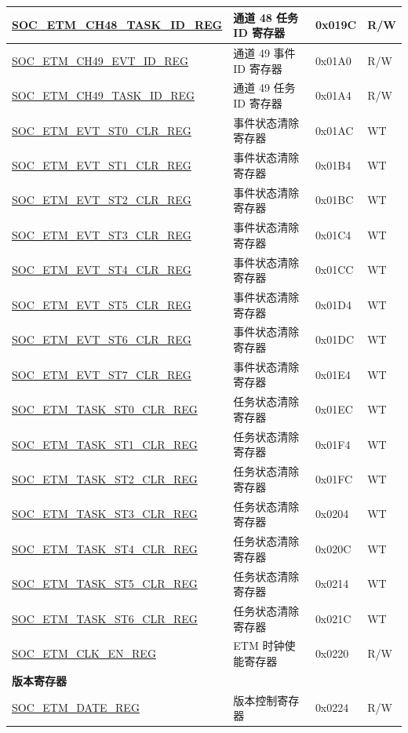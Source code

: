 \begin{longtable}{ | p{6cm} | p{6.4cm} | p{1.3cm} | p{1.8cm} | }
\hyperref[regdesc:SOCETMCH0TASKIDREG]{SOC\_ETM\_CH48\_TASK\_ID\_REG} & 通道 48 任务 ID 寄存器 & 0x019C & R/W \\ \hline
\hyperref[regdesc:SOCETMCH0EVTIDREG]{SOC\_ETM\_CH49\_EVT\_ID\_REG} & 通道 49 事件 ID 寄存器 & 0x01A0 & R/W \\ \hline
\hyperref[regdesc:SOCETMCH0TASKIDREG]{SOC\_ETM\_CH49\_TASK\_ID\_REG} & 通道 49 任务 ID 寄存器 & 0x01A4 & R/W \\ \hline
\hyperref[regdesc:SOCETMEVTST0CLRREG]{SOC\_ETM\_EVT\_ST0\_CLR\_REG} & 事件状态清除寄存器 & 0x01AC & WT \\ \hline
\hyperref[regdesc:SOCETMEVTST1CLRREG]{SOC\_ETM\_EVT\_ST1\_CLR\_REG} & 事件状态清除寄存器 & 0x01B4 & WT \\ \hline
\hyperref[regdesc:SOCETMEVTST2CLRREG]{SOC\_ETM\_EVT\_ST2\_CLR\_REG} & 事件状态清除寄存器 & 0x01BC & WT \\ \hline
\hyperref[regdesc:SOCETMEVTST3CLRREG]{SOC\_ETM\_EVT\_ST3\_CLR\_REG} & 事件状态清除寄存器 & 0x01C4 & WT \\ \hline
\hyperref[regdesc:SOCETMEVTST4CLRREG]{SOC\_ETM\_EVT\_ST4\_CLR\_REG} & 事件状态清除寄存器 & 0x01CC & WT \\ \hline
\hyperref[regdesc:SOCETMEVTST5CLRREG]{SOC\_ETM\_EVT\_ST5\_CLR\_REG} & 事件状态清除寄存器 & 0x01D4 & WT \\ \hline
\hyperref[regdesc:SOCETMEVTST6CLRREG]{SOC\_ETM\_EVT\_ST6\_CLR\_REG} & 事件状态清除寄存器 & 0x01DC & WT \\ \hline
\hyperref[regdesc:SOCETMEVTST7CLRREG]{SOC\_ETM\_EVT\_ST7\_CLR\_REG} & 事件状态清除寄存器 & 0x01E4 & WT \\ \hline
\hyperref[regdesc:SOCETMTASKST0CLRREG]{SOC\_ETM\_TASK\_ST0\_CLR\_REG} & 任务状态清除寄存器 & 0x01EC & WT \\ \hline
\hyperref[regdesc:SOCETMTASKST1CLRREG]{SOC\_ETM\_TASK\_ST1\_CLR\_REG} & 任务状态清除寄存器 & 0x01F4 & WT \\ \hline
\hyperref[regdesc:SOCETMTASKST2CLRREG]{SOC\_ETM\_TASK\_ST2\_CLR\_REG} & 任务状态清除寄存器 & 0x01FC & WT \\ \hline
\hyperref[regdesc:SOCETMTASKST3CLRREG]{SOC\_ETM\_TASK\_ST3\_CLR\_REG} & 任务状态清除寄存器 & 0x0204 & WT \\ \hline
\hyperref[regdesc:SOCETMTASKST4CLRREG]{SOC\_ETM\_TASK\_ST4\_CLR\_REG} & 任务状态清除寄存器 & 0x020C & WT \\ \hline
\hyperref[regdesc:SOCETMTASKST5CLRREG]{SOC\_ETM\_TASK\_ST5\_CLR\_REG} & 任务状态清除寄存器 & 0x0214 & WT \\ \hline
\hyperref[regdesc:SOCETMTASKST6CLRREG]{SOC\_ETM\_TASK\_ST6\_CLR\_REG} & 任务状态清除寄存器 & 0x021C & WT \\ \hline
\hyperref[regdesc:SOCETMCLKENREG]{SOC\_ETM\_CLK\_EN\_REG} & ETM 时钟使能寄存器 & 0x0220 & R/W \\ \hline
\multicolumn{4}{|l|}{\textbf{版本寄存器}} \\ \hline
\hyperref[regdesc:SOCETMDATEREG]{SOC\_ETM\_DATE\_REG} & 版本控制寄存器 & 0x0224 & R/W \\ \hline
\end{longtable}
